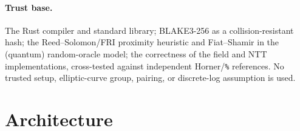 \documentclass[11pt,a4paper]{article}
\begin{document}
\paragraph{Trust base.} The Rust compiler and standard library; BLAKE3-256
as a collision-resistant hash; the Reed--Solomon/FRI proximity heuristic and
Fiat--Shamir in the (quantum) random-oracle model; the correctness of the
field and NTT implementations, cross-tested against independent
Horner/\texttt{\%} references. No trusted setup, elliptic-curve group,
pairing, or discrete-log assumption is used.

\section{Architecture}

\begin{center}
\end{center}
\end{document}
